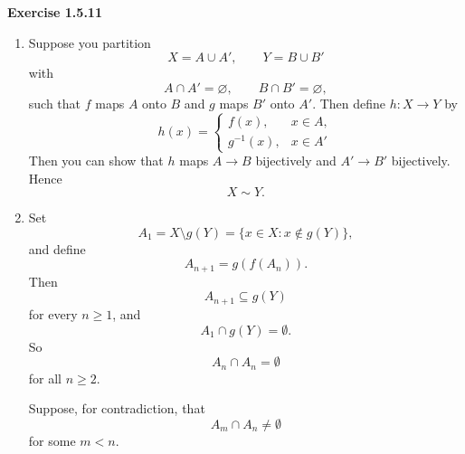 \documentclass[12pt]{article}
\begin{document}
\noindent{} \textbf{Exercise 1.5.11}
\begin{enumerate}
    \item [(a)] Suppose you partition
          \[
              X=A\cup A',\qquad Y=B\cup B'
          \]
          with
          \[
              A\cap A'=\varnothing,\qquad B\cap B'=\varnothing,
          \]
          such that \(f\) maps \(A\) onto \(B\) and \(g\) maps \(B'\) onto \(A'\).
          Then define $h: X \to Y$ by
          \[
              h(x)=
              \begin{cases}
                  f(x),      & x\in A, \\
                  g^{-1}(x), & x\in A'
              \end{cases}
          \]
          Then you can show that $h$ maps $A \to B$ bijectively and $A' \to B'$ bijectively.
          Hence
          \[ X \sim Y.\]
    \item [(b)] Set
          \[
              A_1 = X \setminus g(Y) = \{x \in X : x \notin g(Y)\},
          \]
          and define
          \[
              A_{n+1} = g(f(A_n)).
          \]
          Then
          \[
              A_{n+1} \subseteq g(Y)
          \]
          for every $n \geq 1$, and
          \[
              A_1 \cap g(Y) = \emptyset.
          \]
          So
          \[
              A_n \cap A_n = \emptyset
          \]
          for all $n \geq 2$.

          Suppose, for contradiction, that
          \[
              A_m \cap A_n \neq \emptyset
          \]
          for some $m < n$.


\end{enumerate}
\end{document}
